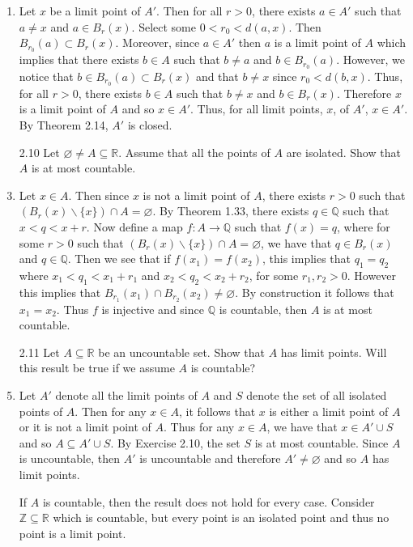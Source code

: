\documentclass[12pt]{article}
\makeatletter
\theoremstyle{definition}
\theoremstyle{remark}
\renewenvironment{proof}[1][\proofname]{\par
  \pushQED{\qed}%
  \normalfont \topsep6\p@\@plus6\p@\relax
  \list{}{\leftmargin=0mm
          \rightmargin=4mm
          \settowidth{\itemindent}{\itshape#1}%
          \labelwidth=\itemindent
          \parsep=0pt \listparindent=\parindent 
  }
  \item[\hskip\labelsep
        \itshape
    #1\@addpunct{.}]\ignorespaces
}{%
  \popQED\endlist\@endpefalse
}
\let\oldproofname=\proofname
\renewcommand{\proofname}{\bf{\textit{\oldproofname}}}
\makeatother
\begin{document}
\begin{enumerate}[leftmargin=*]
\begin{proof}
                    Let $x$ be a limit point of $A'$. Then for all $r>0$, there exists $a\in A'$ such that $a\neq x$ and $a\in B_r(x)$. Select some $0<r_0<d(a,x)$. Then $B_{r_0}(a)\subset B_r(x)$. Moreover, since $a\in A'$ then $a$ is a limit point of $A$ which implies that there exists $b\in A$ such that $b\neq a$ and $b\in B_{r_0}(a)$. However, we notice that $b\in B_{r_0}(a)\subset B_r(x)$ and that $b\neq x$ since $r_0<d(b,x)$. Thus, for all $r>0$, there exists $b\in A$ such that $b\neq x$ and $b\in B_r(x)$. Therefore $x$ is a limit point of $A$ and so $x\in A'$. Thus, for all limit points, $x$, of $A'$, $x\in A'$. By Theorem 2.14, $A'$ is closed.
                \end{proof}
            \item[2.10] Let $\varnothing\neq A\subseteq\mathbb{R}$. Assume that all the points of $A$ are isolated. Show that $A$ is at most countable.
                \begin{proof}
                    Let $x\in A$. Then since $x$ is not a limit point of $A$, there exists $r>0$ such that $(B_r(x)\backslash\{x\})\cap A=\varnothing$. By Theorem 1.33, there exists $q\in\mathbb{Q}$ such that $x<q<x+r$. Now define a map $f\colon A\rightarrow\mathbb{Q}$ such that $f(x)=q$, where for some $r>0$ such that $(B_r(x)\backslash\{x\})\cap A=\varnothing$, we have that $q\in B_r(x)$ and $q\in\mathbb{Q}$. Then we see that if $f(x_1)=f(x_2)$, this implies that $q_1=q_2$ where $x_1<q_1<x_1+r_1$ and $x_2<q_2<x_2+r_2$, for some $r_1,r_2>0$. However this implies that $B_{r_1}(x_1)\cap B_{r_2}(x_2)\neq\varnothing$. By construction it follows that $x_1=x_2$. Thus $f$ is injective and since $\mathbb{Q}$ is countable, then $A$ is at most countable.
                \end{proof}
            \item[2.11] Let $A\subseteq\mathbb{R}$ be an uncountable set. Show that $A$ has limit points. Will this result be true if we assume $A$ is countable?
                \begin{proof}
                    Let $A'$ denote all the limit points of $A$ and $S$ denote the set of all isolated points of $A$. Then for any $x\in A$, it follows that $x$ is either a limit point of $A$ or it is not a limit point of $A$. Thus for any $x\in A$, we have that $x\in A'\cup S$ and so $A\subseteq A'\cup S$. By Exercise 2.10, the set $S$ is at most countable. Since $A$ is uncountable, then $A'$ is uncountable and therefore $A'\neq\varnothing$ and so $A$ has limit points.\par\hspace{4mm} If $A$ is countable, then the result does not hold for every case. Consider $\mathbb{Z}\subseteq\mathbb{R}$ which is countable, but every point is an isolated point and thus no point is a limit point.

\end{proof}
\end{enumerate}
\end{document}
